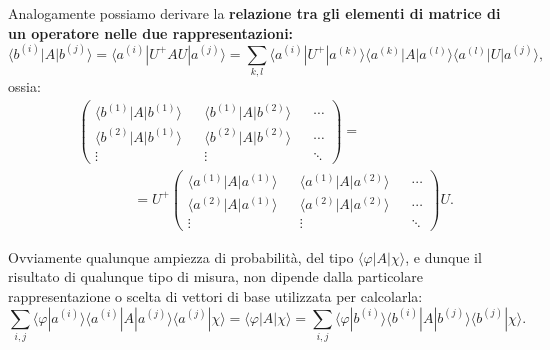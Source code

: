 Analogamente possiamo derivare  la \textbf{relazione tra gli elementi di matrice di un operatore nelle due rappresentazioni:}
	\begin{equation}
		\boxed{
			\langle b^{(i)} | A | b^{(j)} \rangle = \langle a^{(i)} |  U^+AU | a^{(j)} \rangle = \sum \limits_{k,l} \langle a^{(i)} | U^+ |a^{(k)} \rangle \langle a^{(k)} | A | a^{(l)} \rangle \langle a^{(l)} | U  | a^{(j)} \rangle ,
			}
	\end{equation}
ossia:
	\begin{equation}
		\boxed{
		\begin{aligned}
			&\begin{pmatrix}
			\langle b^{(1)} | A | b^{(1)} \rangle  && \langle b^{(1)} | A | b^{(2)} \rangle && \cdots \\
			\langle b^{(2)} | A | b^{(1)} \rangle && \langle b^{(2)} | A | b^{(2)} \rangle && \cdots \\
			\vdots && \vdots && \ddots
			\end{pmatrix} = \\
			& \qquad\qquad = U^+
			\begin{pmatrix}
			\langle a^{(1)} | A | a^{(1)} \rangle && \langle a^{(1)} | A | a^{(2)} \rangle && \cdots \\
			\langle a^{(2)} | A | a^{(1)} \rangle && \langle a^{(2)} | A | a^{(2)} \rangle && \cdots \\
			\vdots && \vdots && \ddots
			\end{pmatrix} U .
		\end{aligned}
			}
	\end{equation}

Ovviamente qualunque ampiezza di probabilità, del tipo $ \langle \varphi | A | \chi \rangle $, e dunque il risultato di qualunque tipo di misura, non dipende dalla particolare rappresentazione o scelta di vettori di base utilizzata per calcolarla:
\begin{equation}
\sum \limits_{i,j} \langle \varphi | a^{(i)} \rangle \langle a^{(i)} | A | a^{(j)} \rangle \langle a^{(j)} | \chi \rangle = \langle \varphi | A | \chi \rangle = \sum \limits_{i,j} \langle \varphi | b^{(i)} \rangle \langle b^{(i)} | A | b^{(j)} \rangle \langle b^{(j)} | \chi \rangle .
\end{equation}


